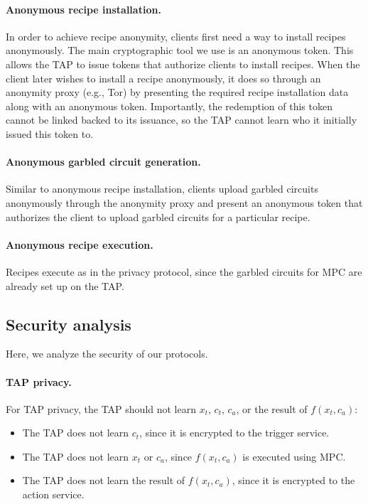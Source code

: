 \paragraph{Anonymous recipe installation.} In order to achieve recipe anonymity,
clients first need a way to install recipes anonymously. The main cryptographic
tool we use is an anonymous token. This allows the TAP to issue tokens that
authorize clients to install recipes. When the client later wishes to install a
recipe anonymously, it does so through an anonymity proxy (e.g., Tor) by
presenting the required recipe installation data along with an anonymous
token. Importantly, the redemption of this token cannot be linked backed to its
issuance, so the TAP cannot learn who it initially issued this token to.

\paragraph{Anonymous garbled circuit generation.}
Similar to anonymous recipe installation, clients upload garbled circuits
anonymously through the anonymity proxy and present an anonymous token that
authorizes the client to upload garbled circuits for a particular recipe.

\paragraph{Anonymous recipe execution.} Recipes execute as in the privacy
protocol, since the garbled circuits for MPC are already set up on the TAP.

\subsection{Security analysis}

Here, we analyze the security of our protocols.

\paragraph{TAP privacy.} For TAP privacy, the TAP should not learn $x_t$, $c_t$,
$c_a$, or the result of $f(x_t, c_a)$:
\begin{itemize}
  \item The TAP does not learn $c_t$, since it is encrypted to the trigger
    service.
  \item The TAP does not learn $x_t$ or $c_a$, since $f(x_t, c_a)$ is executed
    using MPC.
  \item The TAP does not learn the result of $f(x_t, c_a)$, since it is
    encrypted to the action service.
\end{itemize}

